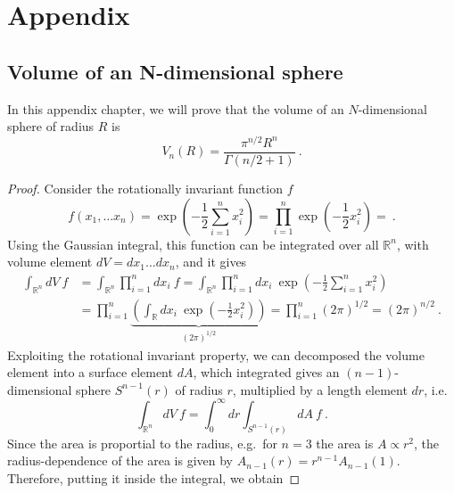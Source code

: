 \appendix

\part{Appendix}

\chapter{Volume of an N-dimensional sphere}

    In this appendix chapter, we will prove that the volume of an $N$-dimensional sphere of radius $R$ is 
    \begin{equation}\label{app:volumen}
        V_n (R) = \frac{\pi^{n/2} R^n}{\Gamma(n/2 + 1)} ~.
    \end{equation}
    \begin{proof}
        Consider the rotationally invariant function $f$ 
        \begin{equation*}
            f(x_1, \ldots x_n) = \exp(- \frac{1}{2} \sum_{i=1}^{n} x_i^2 ) = \prod_{i=1}^{n} \exp(- \frac{1}{2} x_i^2 ) =~.
        \end{equation*}
        Using the Gaussian integral, this function can be integrated over all $\mathbb R^n$, with volume element $dV = dx_1 \ldots dx_n$, and it gives
        \begin{equation*}
        \begin{aligned}
            \int_{\mathbb R^n} dV ~ f & = \int_{\mathbb R^n} \prod_{i=1}^n dx_i ~ f = \int_{\mathbb R^n} \prod_{i=1}^n dx_i ~ \exp(- \frac{1}{2} \sum_{i=1}^{n} x_i^2 ) \\ & = \prod_{i=1}^{n} \underbrace{( \int_{\mathbb R} dx_i ~ \exp(- \frac{1}{2} x_i^2 ))}_{(2 \pi)^{1/2}} = \prod_{i=1}^{n} (2 \pi)^{1/2} = (2 \pi)^{n/2} ~.
        \end{aligned}
        \end{equation*}
        Exploiting the rotational invariant property, we can decomposed the volume element into a surface element $dA$, which integrated gives an $(n-1)$-dimensional sphere $S^{n-1} (r)$ of radius $r$, multiplied by a length element $dr$, i.e.
        \begin{equation*}
            \int_{\mathbb R^n} dV ~ f = \int_0^\infty dr \int_{S^{n-1} (r)} dA ~ f ~.
        \end{equation*}
        Since the area is proportial to the radius, e.g.~for $n=3$ the area is $A \propto r^2$, the radius-dependence of the area is given by $A_{n-1}(r) = r^{n-1} A_{n-1} (1)$. Therefore, putting it inside the integral, we obtain 

\end{proof}
